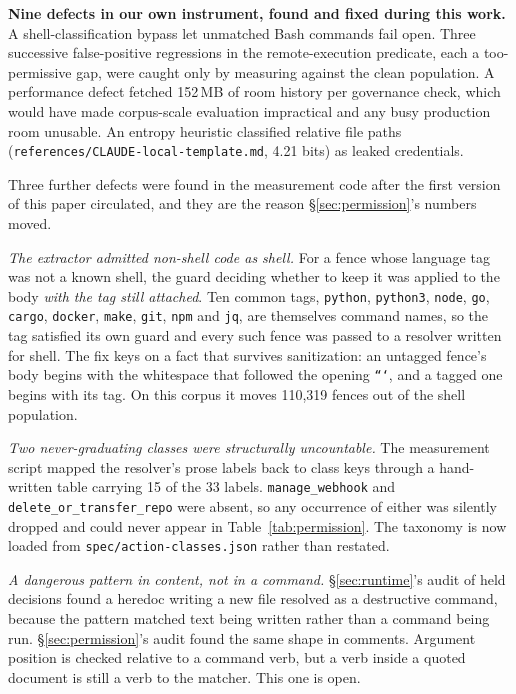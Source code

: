 \documentclass[10pt]{article}
\begin{document}
\textbf{Nine defects in our own instrument, found and fixed during this work.} A
shell-classification bypass let unmatched Bash commands fail open. Three successive
false-positive regressions in the remote-execution predicate, each a
too-permissive gap, were caught only by measuring against the clean population. A
performance defect fetched 152\,MB of room history per governance check, which
would have made corpus-scale evaluation impractical and any busy production room
unusable. An entropy heuristic classified relative file paths
(\texttt{references/CLAUDE-local-template.md}, 4.21 bits) as leaked credentials.

Three further defects were found in the measurement code after the first version of
this paper circulated, and they are the reason \S\ref{sec:permission}'s numbers moved.

\emph{The extractor admitted non-shell code as shell.} For a fence whose language tag
was not a known shell, the guard deciding whether to keep it was applied to the body
\emph{with the tag still attached}. Ten common tags, \texttt{python},
\texttt{python3}, \texttt{node}, \texttt{go}, \texttt{cargo}, \texttt{docker},
\texttt{make}, \texttt{git}, \texttt{npm} and \texttt{jq}, are themselves command
names, so the tag satisfied its own guard and every such fence was passed to a
resolver written for shell. The fix keys on a fact that survives sanitization: an
untagged fence's body begins with the whitespace that followed the opening
\texttt{```}, and a tagged one begins with its tag. On this corpus it moves 110{,}319
fences out of the shell population.

\emph{Two never-graduating classes were structurally uncountable.} The measurement
script mapped the resolver's prose labels back to class keys through a hand-written
table carrying 15 of the 33 labels. \texttt{manage\_webhook} and
\texttt{delete\_or\_transfer\_repo} were absent, so any occurrence of either was
silently dropped and could never appear in Table~\ref{tab:permission}. The taxonomy
is now loaded from \texttt{spec/action-classes.json} rather than restated.

\emph{A dangerous pattern in content, not in a command.} \S\ref{sec:runtime}'s audit
of held decisions found a heredoc writing a new file resolved as a destructive
command, because the pattern matched text being written rather than a command being
run. \S\ref{sec:permission}'s audit found the same shape in comments. Argument
position is checked relative to a command verb, but a verb inside a quoted document
is still a verb to the matcher. This one is open.
\end{document}
